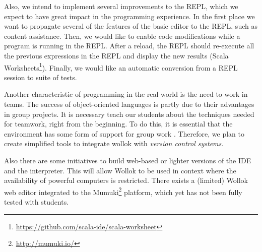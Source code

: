 Also, we intend to implement several improvements to the REPL, which we expect to have great impact in the programming experience.
In the first place we want to propagate several of the features of the basic editor to the REPL, such as content assistance.
Then, we would like to enable code modifications while a program is running in the REPL.
After a reload, the REPL should re-execute all the previous expressions in the REPL and display the new results (\cf Scala Worksheets\footnote{\url{https://github.com/scala-ide/scala-worksheet}}).
Finally, we would like an automatic conversion from a REPL session to suite of tests.

Another characteristic of programming in the real world is the need to work in teams. 
The success of object-oriented languages is partly due to their advantages in group projects. 
It is necessary teach our students about the techniques needed for teamwork, right from the beginning. 
To do this, it is essential that the environment has some form of support for group work \cite{kolling_problem_1999}.
Therefore, we plan to create simplified tools to integrate wollok with \emph{version control systems}.

Also there are some initiatives to build web-based or lighter versions of the IDE and the interpreter.
This will allow Wollok to be used in context where the availability of powerful computers is restricted.
There exists a (limited) Wollok web editor integrated to the Mumuki\footnote{\url{http://mumuki.io/}} platform, which yet has not been fully tested with students.
